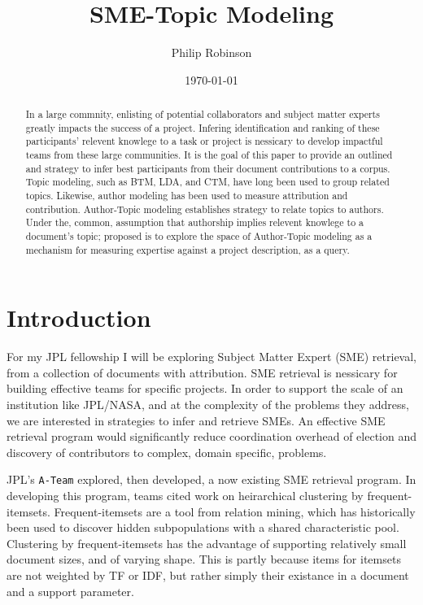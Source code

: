 \documentclass{article}
\title{SME-Topic Modeling}
\date{\today}
\author{Philip Robinson}
\affil{NASA: Jet Propoultion Labratory}
\begin{document}
\maketitle

\begin{abstract}
  In a large commnity, enlisting of potential collaborators and subject matter experts
  greatly impacts the success of a project. Infering identification and ranking of
  these participants' relevent knowlege to a task or project is nessicary to develop
  impactful teams from these large communities\cite{Minto2007}. It is the goal of this
  paper to provide an outlined and strategy to infer best participants from their
  document contributions to a corpus. Topic modeling, such as BTM\cite{Yan2013}, LDA,
  and CTM, have long been used to group related topics\cite{Alghamdi2015}. Likewise,
  author modeling has been used to measure attribution\cite{Rexha2018} and
  contribution\cite{AldebeiHJ016}. Author-Topic modeling establishes strategy to
  relate topics to authors\cite{Rosen-Zvi2004}. Under the, common, assumption that
  authorship implies relevent knowlege to a document's topic; proposed is to explore
  the space of Author-Topic modeling as a mechanism for measuring expertise against a
  project description, as a query.
\end{abstract}


\section{Introduction}

For my JPL fellowship I will be exploring Subject Matter Expert (SME) retrieval,
from a collection of documents with attribution. SME retrieval is nessicary for
building effective teams for specific projects. In order to support the scale of an
institution like JPL/NASA, and at the complexity of the problems they address, we are
interested in strategies to infer and retrieve SMEs. An effective SME retrieval program
would significantly reduce coordination overhead of election and discovery of
contributors to complex, domain specific, problems.

JPL's \texttt{A-Team} explored, then developed, a now existing SME retrieval program.
In developing this program, teams cited work on heirarchical clustering by
frequent-itemsets\cite{wang2003,kiran2010}. Frequent-itemsets\cite{Agrawal1993} are a
tool from relation mining, which has historically been used to discover hidden
subpopulations with a shared characteristic pool. Clustering by frequent-itemsets has the
advantage of supporting relatively small document sizes, and of varying shape. This is
partly because items for itemsets are not weighted by TF or IDF, but rather simply
their existance in a document and a support parameter.
\end{document}
